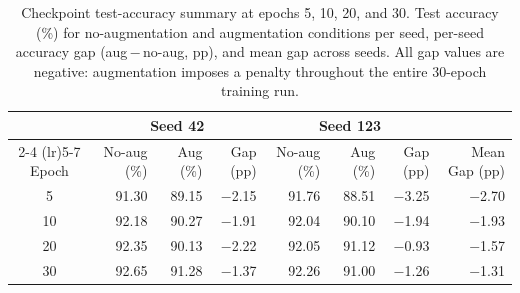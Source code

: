 
\begin{table}[ht]
\centering
\caption{Checkpoint test-accuracy summary at epochs 5, 10, 20, and 30.
  Test accuracy (\%) for no-augmentation and augmentation conditions per seed,
  per-seed accuracy gap (aug\,$-$\,no-aug, pp), and mean gap across seeds.
  All gap values are negative: augmentation imposes a penalty
  throughout the entire 30-epoch training run.}
\label{tab:checkpoint_summary}
\begin{tabular}{c rr r rr r r}
\toprule
 & \multicolumn{3}{c}{Seed 42} & \multicolumn{3}{c}{Seed 123} & \\
\cmidrule(lr){2-4} \cmidrule(lr){5-7}
Epoch & No-aug (\%) & Aug (\%) & Gap (pp) & No-aug (\%) & Aug (\%) & Gap (pp) & Mean Gap (pp) \\
\midrule
5 & 91.30 & 89.15 & $-$2.15 & 91.76 & 88.51 & $-$3.25 & $-$2.70 \\
10 & 92.18 & 90.27 & $-$1.91 & 92.04 & 90.10 & $-$1.94 & $-$1.93 \\
20 & 92.35 & 90.13 & $-$2.22 & 92.05 & 91.12 & $-$0.93 & $-$1.57 \\
30 & 92.65 & 91.28 & $-$1.37 & 92.26 & 91.00 & $-$1.26 & $-$1.31 \\
\bottomrule
\end{tabular}
\end{table}
